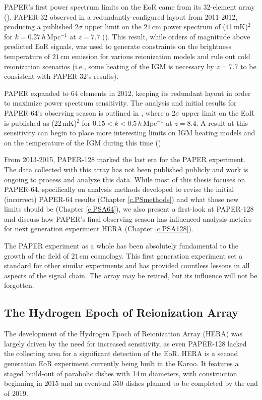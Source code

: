PAPER's first power spectrum limits on the EoR came from its 32-element array (\citealt{parsons_et_al2014}). PAPER-32 observed in a redundantly-configured layout from 2011-2012, producing a published $2\sigma$ upper limit on the $21$\,cm power spectrum of (41\,mK)$^{2}$ for $k=0.27\, h$\,Mpc$^{-1}$ at $z=7.7$ (\citealt{parsons_et_al2014}). This result, while orders of magnitude above predicted EoR signals, was used to generate constraints on the brightness temperature of $21$\,cm emission for various reionization models and rule out cold reionization scenarios (i.e., some heating of the IGM is necessary by $z=7.7$ to be consistent with PAPER-32's results).

PAPER expanded to 64 elements in 2012, keeping its redundant layout in order to maximize power spectrum sensitivity. The analysis and initial results for PAPER-64's observing season is outlined in \citealt{ali_et_al2015}, where a $2\sigma$ upper limit on the EoR is published as (22\,mK)$^{2}$ for $0.15 < k < 0.5\,h$\,Mpc$^{-1}$ at $z=8.4$. A result at this sensitivity can begin to place more interesting limits on IGM heating models and on the temperature of the IGM during this time (\citealt{pober_et_al2015}).

From 2013-2015, PAPER-128 marked the last era for the PAPER experiment. The data collected with this array has not been published publicly and work is ongoing to process and analyze this data. While most of this thesis focuses on PAPER-64, specifically on analysis methods developed to revise the initial (incorrect) PAPER-64 results (Chapter \ref{c.PSmethods}) and what those new limits should be (Chapter \ref{c.PSA64}), we also present a first-look at PAPER-128 and discuss how PAPER's final observing season has influenced analysis metrics for next generation experiment HERA (Chapter \ref{c.PSA128}).

The PAPER experiment as a whole has been absolutely fundamental to the growth of the field of $21$\,cm cosmology. This first generation experiment set a standard for other similar experiments and has provided countless lessons in all aspects of the signal chain. The array may be retired, but its influence will not be forgotten.

\subsection{The Hydrogen Epoch of Reionization Array}

The development of the Hydrogen Epoch of Reionization Array (HERA) was largely driven by the need for increased sensitivity, as even PAPER-128 lacked the collecting area for a significant detection of the EoR. HERA is a second generation EoR experiment currently being built in the Karoo. It features a staged build-out of parabolic dishes with 14\,m diameters, with construction beginning in 2015 and an eventual 350 dishes planned to be completed by the end of 2019.

